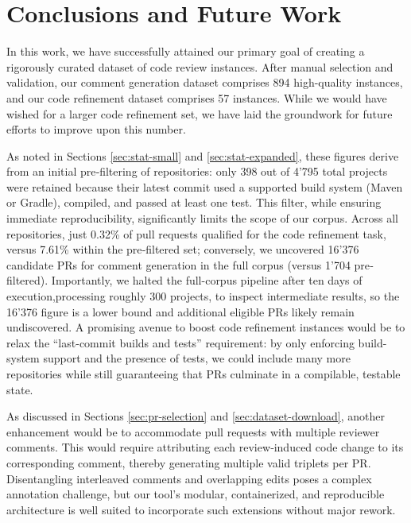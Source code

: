\section{Conclusions and Future Work}

In this work, we have successfully attained our primary goal of creating a rigorously curated
dataset of code review instances. After manual selection and validation, our comment generation
dataset comprises 894 high-quality instances, and our code refinement dataset comprises 57
instances. While we would have wished for a larger code refinement set, we have laid the groundwork
for future efforts to improve upon this number.

As noted in Sections \ref{sec:stat-small} and \ref{sec:stat-expanded}, these figures derive from an
initial pre‐filtering of repositories: only 398 out of 4'795 total projects were retained because
their latest commit used a supported build system (Maven or Gradle), compiled, and passed at least
one test. This filter, while ensuring immediate reproducibility, significantly limits the scope of
our corpus. Across all repositories, just 0.32\% of pull requests qualified for the code refinement
task, versus 7.61\% within the pre‐filtered set; conversely, we uncovered 16'376 candidate PRs for
comment generation in the full corpus (versus 1'704 pre‐filtered). Importantly, we halted the
full-corpus pipeline after ten days of execution,processing roughly 300 projects, to inspect
intermediate results, so the 16'376 figure is a lower bound and additional eligible PRs likely
remain undiscovered. A promising avenue to boost code refinement instances would be to relax the
``last-commit builds and tests'' requirement: by only enforcing build-system support and the presence
of tests, we could include many more repositories while still guaranteeing that PRs culminate in a
compilable, testable state.

As discussed in Sections \ref{sec:pr-selection} and \ref{sec:dataset-download}, another enhancement
would be to accommodate pull requests with multiple reviewer comments. This would require
attributing each review‐induced code change to its corresponding comment, thereby generating
multiple valid triplets per PR. Disentangling interleaved comments and overlapping edits poses a
complex annotation challenge, but our tool's modular, containerized, and reproducible architecture
is well suited to incorporate such extensions without major rework.

